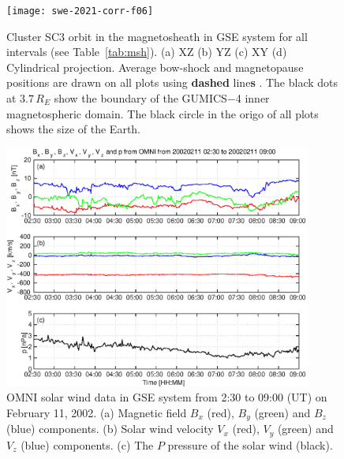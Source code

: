 \documentclass[linenumbers,draft]{agujournal}
\begin{document}
\pagebreak

\begin{figure}[h]
\centering
\texttt{[image: swe-2021-corr-f06]}  
\caption{Cluster SC3 orbit in the magnetosheath in GSE system for all intervals (see Table~\ref{tab:msh}). (a) XZ (b) YZ (c) XY (d) Cylindrical projection. Average bow-shock and magnetopause positions are drawn on all plots using \textbf{dashed} line\textbf{s} \citep[][respectively]{peredo95:_three_alfven_mach,tsyganenko95:_model_earth}. The black dots at $3.7\,R_E$ show the boundary of the GUMICS$-$4 inner magnetospheric domain. The black circle in the origo of all plots shows the size of the Earth.}
\label{fig:mshorbit}
\end{figure}

\pagebreak

\begin{figure}[h]
\centering
\includegraphics[width=0.9\textwidth,angle=0]{swe-2021-corr-f07}  
\caption{OMNI solar wind data in GSE system from 2:30 to 09:00 (UT) on February 11, 2002. (a) Magnetic field $B_{x}$ (red), $B_{y}$ (green) and $B_{z}$ (blue) components. (b) Solar wind velocity $V_{x}$ (red), $V_{y}$ (green) and $V_{z}$ (blue) components. (c) The $P$ pressure of the solar wind (black).}
\label{fig:mshomni}
\end{figure}

\pagebreak
\end{document}
